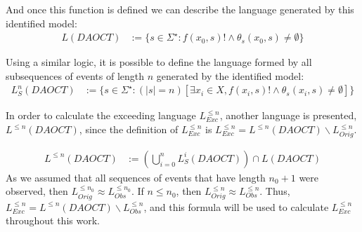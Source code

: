 And once this function is defined we can describe the language generated by this
identified model:
\begin{align}
  L(DAOCT)&:=\{s \in \Sigma^\star : f(x_0,s)! \wedge \theta_s(x_0,s)\neq \emptyset \}
\end{align}

Using a similar logic, it is possible to define the language formed by all
subsequences of events of length $n$ generated by the identified model:
\begin{align}
  L_S^n(DAOCT)&:=\{s \in \Sigma^\star : (|s| = n)\left[\exists x_i \in X,f(x_i,s)! \wedge \theta_s(x_i,s)\neq \emptyset \right]\}
\end{align}

In order to calculate the exceeding language $L_{Exc}^{\leq n}$, another
language is presented, $L^{\leq n}(DAOCT)$, since the definition of
$L_{Exc}^{\leq n}$ is $L_{Exc}^{\leq n}=L^{\leq n}(DAOCT)\backslash
L_{Orig}^{\leq n}$.


\begin{align}
  L^{\leq n}(DAOCT)&:=\left( \bigcup_{i=0}^n L_S^i(DAOCT) \right)\cap L(DAOCT)
\end{align}
As we assumed that all sequences of events that have length $n_0+1$ were
observed, then $L_{Orig}^{\leq n_0}\approx L_{Obs}^{\leq n_0}$. If $n\leq n_0$,
then $L_{Orig}^{\leq n}\approx L_{Obs}^{\leq n}$. Thus, $L_{Exc}^{\leq n}=L^{\leq n}(DAOCT)\backslash
L_{Obs}^{\leq n}$, and this formula will be used to calculate $L_{Exc}^{\leq n}$
throughout this work. 
